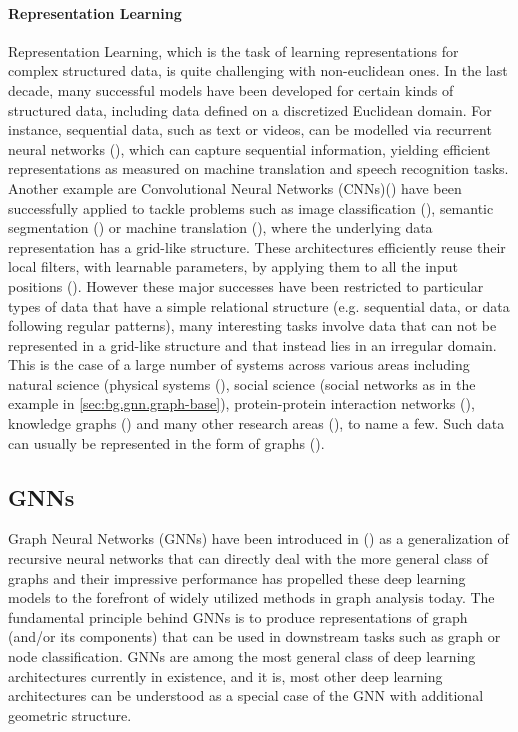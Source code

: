 \documentclass[binding=0.6cm]{sapthesis}
\newcommand{\mycite}[1]{(\cite{#1})}
\begin{document}
\paragraph{Representation Learning}
\label{sec:bg.gnn.repr-learning}
Representation Learning, which is the task of learning representations for complex structured data, is quite challenging with non-euclidean ones. In the last decade, many successful models have been developed for certain kinds of structured data, including data defined on a discretized Euclidean domain. For instance, sequential data, such as text or videos, can be modelled via recurrent neural networks \mycite{TEAlab2018334}, which can capture sequential information, yielding efficient representations as measured on machine translation and speech recognition tasks. Another example are Convolutional Neural Networks (CNNs)\mycite{Lecun1998cnn} have been successfully applied to tackle problems such as image classification (\cite{venkatesan2017convolutional}), semantic segmentation (\cite{jégou2017layers}) or machine translation (\cite{gehring2017convolutional}), where the underlying data representation has a grid-like structure. These architectures efficiently reuse their local filters, with learnable parameters, by applying them to all the input positions \mycite{LeCun2015DeepL}. However these major successes have been restricted to particular types of data that have a simple relational structure (e.g. sequential data, or data following regular patterns), many interesting tasks involve data that can not be represented in a grid-like structure and that instead lies in an irregular domain. This is the case of a large number of systems across various areas including natural science (physical systems (\cite{pmlr-v80-sanchez-gonzalez18a}), social science (social networks as in the example in \cref{sec:bg.gnn.graph-base}), protein-protein interaction networks (\cite{nips2017_PPI}), knowledge graphs (\cite{ijcai2017p250}) and many other research areas (\cite{nips2017_combOpt}), to name a few. Such data can usually be represented in the form of graphs \mycite{veličković2018gat}.


\subsection{GNNs}
\label{sec:bg.gnn.gnns}
Graph Neural Networks (GNNs) have been introduced in \mycite{Gori2005graphDomain,gnnModel2009} as a generalization of recursive neural networks that can directly deal with the more general class of graphs and their impressive performance has propelled these deep learning models to the forefront of widely utilized methods in graph analysis today. The fundamental principle behind GNNs is to produce representations of graph (and/or its components) that can be used in downstream tasks such as graph or node classification. GNNs are among the most general class of deep learning architectures currently in existence, and it is, most other deep learning architectures can be understood as a special case of the GNN with additional geometric structure.
\end{document}
